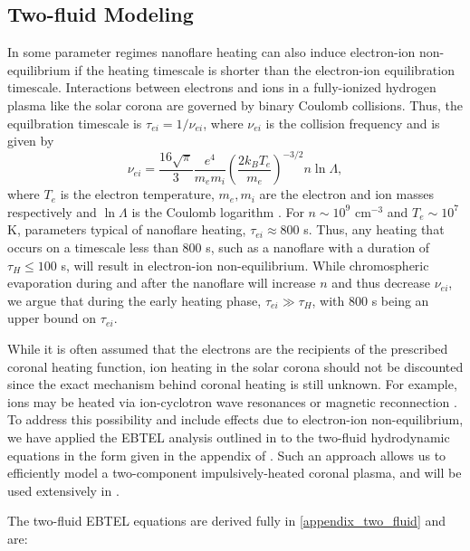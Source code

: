 \documentclass[]{aastex}
\begin{document}
	\subsection{Two-fluid Modeling}
	\label{subsec:two_fluid_theory}
	\par In some parameter regimes nanoflare heating can also induce electron-ion non-equilibrium if the heating timescale is shorter than the electron-ion equilibration timescale. Interactions between electrons and ions in a fully-ionized hydrogen plasma like the solar corona are governed by binary Coulomb collisions. Thus, the equilbration timescale is $\tau_{ei}=1/\nu_{ei}$, where $\nu_{ei}$ is the collision frequency and is given by
	\begin{equation}
		\nu_{ei} = \frac{16\sqrt{\pi}}{3}\frac{e^4}{m_em_i}\left(\frac{2k_BT_e}{m_e}\right)^{-3/2}n\ln{\Lambda},
	\end{equation}
	where $T_e$ is the electron temperature, $m_e,m_i$ are the electron and ion masses respectively and $\ln{\Lambda}$ is the Coulomb logarithm \citep[see Eq. 2.5e and Section 3 of][]{braginskii_transport_1965}. For $n\sim10^9$ cm$^{-3}$ and $T_e\sim10^{7}$ K, parameters typical of nanoflare heating, $\tau_{ei}\approx800$ s. Thus, any heating that occurs on a timescale less than 800 s, such as a nanoflare with a duration of $\tau_H\le100$ s, will result in electron-ion non-equilibrium. While chromospheric evaporation during and after the nanoflare will increase $n$ and thus decrease $\nu_{ei}$, we argue that during the early heating phase, $\tau_{ei}\gg\tau_H$, with 800 s being an upper bound on $\tau_{ei}$. 
	\par While it is often assumed that the electrons are the recipients of the prescribed coronal heating function, ion heating in the solar corona should not be discounted since the exact mechanism behind coronal heating is still unknown. For example, ions may be heated via ion-cyclotron wave resonances \citep{markovskii_intermittent_2004} or magnetic reconnection \citep{ono_ion_1996,drake_onset_2014}. To address this possibility and include effects due to electron-ion non-equilibrium, we have applied the EBTEL analysis outlined in \citet{klimchuk_highly_2008} to the two-fluid hydrodynamic equations in the form given in the appendix of \citet{bradshaw_influence_2013}. Such an approach allows us to efficiently model a two-component impulsively-heated coronal plasma, and will be used extensively in .
	\par The two-fluid EBTEL equations are derived fully in \autoref{appendix_two_fluid} and are:
\end{document}
